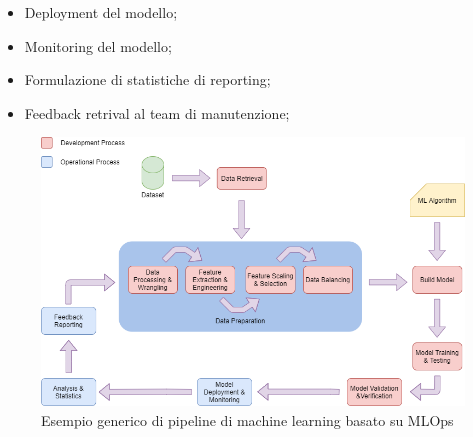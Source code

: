 \begin{itemize}
    \item Deployment del modello;
    \item Monitoring del modello;
    \item Formulazione di statistiche di reporting;
    \item Feedback retrival al team di manutenzione;
\end{itemize}

\begin{figure}[h]
        \centering
        \includegraphics[width=1\textwidth]{figure/Ml Pipeline.png}
        \caption{Esempio generico di pipeline di machine learning basato su MLOps}
\end{figure}
\newpage